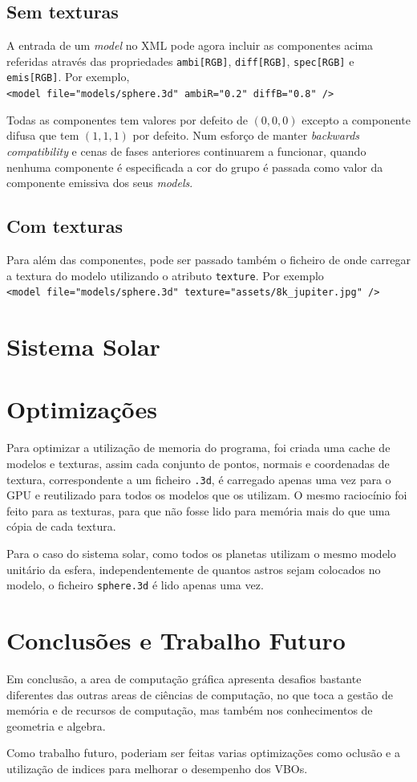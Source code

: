 \documentclass[a4paper]{article}
\begin{document}
\subsection{Sem texturas}
A entrada de um \textit{model} no XML pode agora incluir as componentes acima
referidas através das propriedades \texttt{ambi[RGB]}, \texttt{diff[RGB]},
\texttt{spec[RGB]} e \texttt{emis[RGB]}. Por exemplo,\\
\verb!<model file="models/sphere.3d" ambiR="0.2" diffB="0.8" />!

Todas as componentes tem valores por defeito de $(0,0,0)$ excepto a componente
difusa que tem $(1,1,1)$ por defeito. Num esforço de manter \textit{backwards
compatibility} e cenas de fases anteriores continuarem a funcionar, quando
nenhuma componente é especificada a cor do grupo é passada como valor da
componente emissiva dos seus \textit{models}.

\subsection{Com texturas}

Para além das componentes, pode ser passado também o ficheiro de onde carregar
a textura do modelo utilizando o atributo \texttt{texture}. Por exemplo\\
\verb!<model file="models/sphere.3d" texture="assets/8k_jupiter.jpg" />!

\section{Sistema Solar}

\section{Optimizações}
Para optimizar a utilização de memoria do programa, foi criada uma cache de
modelos e texturas, assim cada conjunto de pontos, normais e coordenadas de
textura, correspondente a um ficheiro \texttt{.3d}, é carregado apenas uma vez
para o GPU e reutilizado para todos os modelos que os utilizam. O mesmo
raciocínio foi feito para as texturas, para que não fosse lido para memória
mais do que uma cópia de cada textura.

Para o caso do sistema solar, como todos os planetas utilizam o mesmo modelo
unitário da esfera, independentemente de quantos astros sejam colocados no
modelo, o ficheiro \texttt{sphere.3d} é lido apenas uma vez.

\section{Conclusões e Trabalho Futuro}

Em conclusão, a area de computação gráfica apresenta desafios bastante diferentes das outras areas de ciências de computação, no que toca a gestão de memória e de recursos de computação, mas também nos conhecimentos de geometria e algebra.

Como trabalho futuro, poderiam ser feitas varias optimizações como oclusão e a utilização de indices para melhorar o desempenho dos VBOs.
\end{document}
